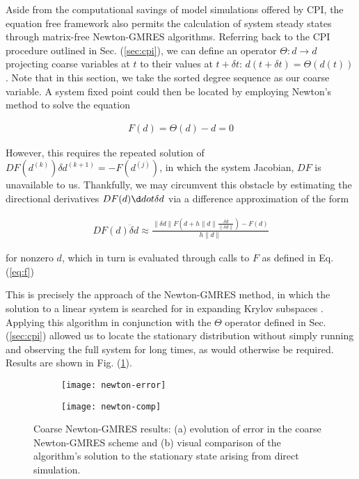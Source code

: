 \documentclass[epjST, final]{svjour}
\begin{document}
\begin{onehalfspace}
Aside from the computational savings of model simulations offered by
CPI, the equation free framework also permits the calculation of
system steady states through matrix-free Newton-GMRES
algorithms. Referring back to the CPI procedure outlined in
Sec. (\ref{sec:cpi}), we can define an operator
$\Theta: d \rightarrow d$ projecting coarse variables at $t$ to their
values at $t + \delta t$: $d(t+\delta t) =\Theta(d(t))$. Note that in
this section, we take the sorted degree sequence as our coarse
variable. A system fixed point could then be located by employing
Newton's method to solve the equation

\begin{align}
\label{eq:f}
F(d) = \Theta(d) - d = 0
\end{align}

However, this requires the repeated solution of
$DF(d^{(k)}) \delta d^{(k+1)} = -F(d^{(j)})$, in which the system
Jacobian, $DF$ is unavailable to us. Thankfully, we may circumvent
this obstacle by estimating the directional derivatives
$DF(d) \d dot \delta d$ via a difference approximation of the form

\begin{align}
  DF(d) \ddot \delta d \approx \frac{\| \delta d \| F(d + h \| d \| \frac{\delta d}{\| \delta d \|}) - F(d)}{h \| d \|}
\end{align}

for nonzero $d$, which in turn is evaluated through calls to $F$ as defined in Eq. (\ref{eq:f})

This is precisely the approach of the Newton-GMRES method, in which the solution to a linear system is searched for in expanding Krylov subspaces \cite{kelley_solving_2003}. Applying this algorithm in conjunction with the $\Theta$ operator defined in Sec. (\ref{sec:cpi}) allowed us to locate the stationary distribution without simply running and observing the full system for long times, as would otherwise be required. Results are shown in Fig. (\ref{fig:newton-results}).

\begin{figure}[h!]
  \vspace{-5mm}
  \centering
  \begin{subfigure}{0.49\textwidth}
    \centering
    \texttt{[image: newton-error]}
    \subcaption{\label{fig:newton-error}}
  \end{subfigure} %
  \begin{subfigure}{0.49\textwidth}
    \centering
    \texttt{[image: newton-comp]}
    \subcaption{\label{fig:newton-comp}}
  \end{subfigure}%
  \caption{Coarse Newton-GMRES results: (a) evolution of error in the
    coarse Newton-GMRES scheme and (b) visual comparison of the
    algorithm's solution to the stationary state arising from direct
    simulation. \label{fig:newton-results}}
\end{figure}



\end{onehalfspace}
\end{document}
